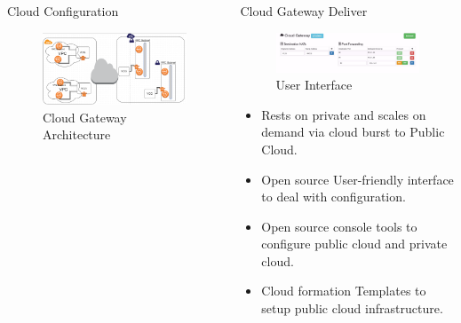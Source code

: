\documentclass[final]{beamer}
\newlength{\onecolwid}
\newlength{\twocolwid}
\begin{document}
\begin{frame}[t]
\begin{columns}[t]
\begin{column}{\twocolwid}
\begin{columns}[t,totalwidth=\twocolwid]
\begin{column}{\onecolwid}
\begin{block}{Cloud Configuration}
\begin{figure}
\includegraphics[width=0.8\linewidth]{connection.png}
\caption{Cloud Gateway Architecture}
\end{figure}

\end{block}


\end{column} %

\begin{column}{\onecolwid} %


\begin{block}{Cloud Gateway Deliver}

\begin{figure}
\includegraphics[width=0.8\linewidth]{interface.jpg}
\caption{User Interface}
\end{figure}


\begin{itemize}
\item Rests on private and scales on demand via cloud burst to Public Cloud.
\item Open source User-friendly interface to deal with configuration.
\item Open source console tools to configure public cloud and private cloud.
\item Cloud formation Templates to setup public cloud infrastructure.
\end{itemize}


\end{block}
\end{column}
\end{columns}
\end{column}
\end{columns}
\end{frame}
\end{document}
